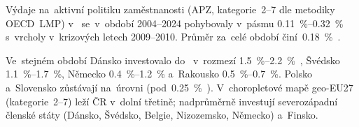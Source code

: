 Výdaje na~aktivní politiku zaměstnanosti (\ac{APZ}, kategorie~2--7 dle metodiky \acs{OECD}~\acs{LMP}) v~ se~v~období 2004--2024 pohybovaly v~pásmu \SIrange{0,11}{0,32}{\percent}~ s~vrcholy v~krizových letech 2009--2010. Průměr za~celé období činí~\SI{0,18}{\percent}~.

Ve~stejném období Dánsko investovalo do~ v~rozmezí \SIrange{1,5}{2,2}{\percent}~, Švédsko \SIrange{1,1}{1,7}{\percent}, Německo \SIrange{0,4}{1,2}{\percent} a~Rakousko \SIrange{0,5}{0,7}{\percent}. Polsko a~Slovensko zůstávají na~úrovni  (pod~\SI{0,25}{\percent}~). V~choropletové mapě \acs{geo-EU27} (kategorie~2--7) leží \ac{ČR} v~dolní třetině; nadprůměrně investují severozápadní členské státy (Dánsko, Švédsko, Belgie, Nizozemsko, Německo) a~Finsko.



